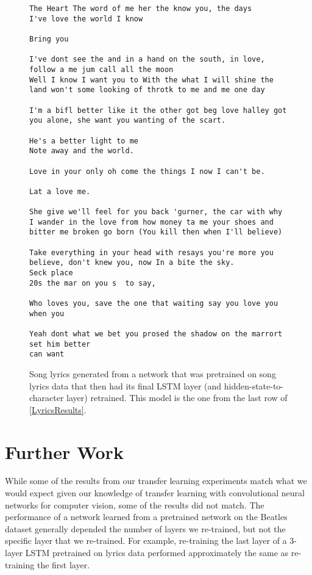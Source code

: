 \documentclass[10pt,twocolumn,letterpaper]{article}
\begin{document}
		\begin{figure}
			\begin{lstlisting}
The Heart The word of me her the know you, the days
I've love the world I know

Bring you

I've dont see the and in a hand on the south, in love, follow a me jum call all the moon  
Well I know I want you to With the what I will shine the land won't some looking of throtk to me and me one day

I'm a bifl better like it the other got beg love halley got you alone, she want you wanting of the scart.

He's a better light to me  
Note away and the world.

Love in your only oh come the things I now I can't be.

Lat a love me.

She give we'll feel for you back 'gurner, the car with why I wander in the love from how money ta me your shoes and bitter me broken go born (You kill then when I'll believe)

Take everything in your head with resays you're more you believe, don't knew you, now In a bite the sky.
Seck place
20s the mar on you s  to say,

Who loves you, save the one that waiting say you love you when you

Yeah dont what we bet you prosed the shadow on the marrort set him better
can want
			\end{lstlisting}
			\caption{Song lyrics generated from a network that was pretrained on song lyrics data that then had its final LSTM layer (and hidden-state-to-character layer) retrained. This model is the one from the last row of \tablename{\ref{LyricsResults}}.}
			\label{lyrics_sample}
		\end{figure}

\section{Further Work}
	While some of the results from our transfer learning experiments match what we would expect given our knowledge of transfer learning with convolutional neural networks for computer vision, some of the results did not match. The performance of a network learned from a pretrained network on the Beatles dataset generally depended the number of layers we re-trained, but not the specific layer that we re-trained. For example, re-training the last layer of a 3-layer LSTM pretrained on lyrics data performed approximately the same as re-training the first layer.
	
\end{document}
